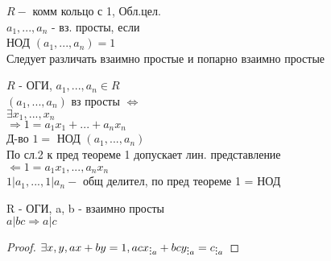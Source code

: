 
$ R - $ комм кольцо с 1, Обл.цел. \\
$ a_1, ..., a_n $ - вз. просты, если \\
НОД $  (a_1, ..., a_n) = 1$\\
Следует различать взаимно простые и попарно взаимно простые \\
\begin{theorem}
	$ R $ - ОГИ, $ a_1, ..., a_n \in R $ \\
	$  (a_1, ..., a_n) $ вз просты $ \Leftrightarrow $ \\
	$ \exists x_1, ..., x_n $ \\
	$ \Rightarrow 1 = a_1x_1 + ... + a_nx_n $ \\
	Д-во $ 1 = $ НОД $  (a_1, ..., a_n) $ \\
	По сл.2 к пред теореме 1 допускает лин. представление \\
	$ \Leftarrow 1 =  a_1x_1, ..., a_nx_n $ \\
	$ 1 | a_1, ..., 1 | a_n -$ общ делител, по пред теореме 1 = НОД 
\end{theorem}
\begin{theorem}
	R - ОГИ, a, b - взаимно просты \\
	$ a | bc \Rightarrow a | c $ \\
	\begin{proof}
		$ \exists x, y, ax + by = 1, acx_{\divby a} + bcy_{\divby a} = c_{\divby a} $
	\end{proof}
\end{theorem}

